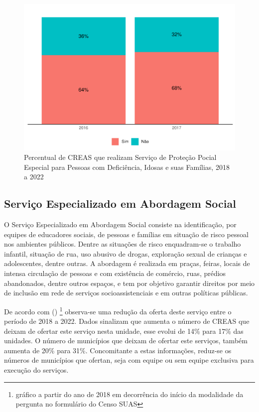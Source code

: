\documentclass[
  brazilian]{report}
\begin{document}
\begin{figure}
\includegraphics{Censo-SUAS-2022_files/figure-latex/creas-pse-domicilio-1} \caption[Percentual de CREAS que realizam Serviço de Proteção Pocial Especial para Pessoas com Deficiência, Idosas e suas Famílias, 2018 a 2022]{Percentual de CREAS que realizam Serviço de Proteção Pocial Especial para Pessoas com Deficiência, Idosas e suas Famílias, 2018 a 2022}\label{fig:creas-pse-domicilio}
\end{figure}

\hypertarget{serviuxe7o-especializado-em-abordagem-social}{%
\subsection{Serviço Especializado em Abordagem
Social}\label{serviuxe7o-especializado-em-abordagem-social}}

O Serviço Especializado em Abordagem Social consiste na identificação,
por equipes de educadores sociais, de pessoas e famílias em situação de
risco pessoal nos ambientes públicos. Dentre as situações de risco
enquadram-se o trabalho infantil, situação de rua, uso abusivo de
drogas, exploração sexual de crianças e adolescentes, dentre outras. A
abordagem é realizada em praças, feiras, locais de intensa circulação de
pessoas e com existência de comércio, ruas, prédios abandonados, dentre
outros espaços, e tem por objetivo garantir direitos por meio de
inclusão em rede de serviços socioassistenciais e em outras políticas
públicas.

De acordo com ()
\footnote{gráfico a partir do ano de 2018 em decorrência do início da modalidade da pergunta no formulário do Censo SUAS}
observa-se uma redução da oferta deste serviço entre o período de 2018 a
2022. Dados sinalizam que aumenta o número de CREAS que deixam de
ofertar este serviço nesta unidade, esse evolui de 14\% para 17\% das
unidades. O número de municípios que deixam de ofertar este serviços,
também aumenta de 20\% para 31\%. Concomitante a estas informações,
reduz-se os números de municípios que ofertan, seja com equipe ou sem
equipe exclusiva para execução do serviços.
\end{document}
